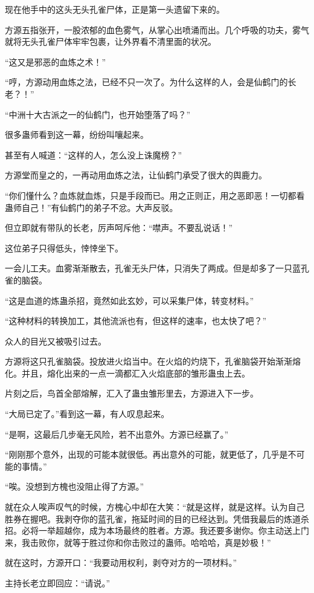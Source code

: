 \begin{this_body}
现在他手中的这头无头孔雀尸体，正是第一头遗留下来的。

方源五指张开，一股浓郁的血色雾气，从掌心出喷涌而出。几个呼吸的功夫，雾气就将无头孔雀尸体牢牢包裹，让外界看不清里面的状况。

“这又是邪恶的血炼之术！”

“哼，方源动用血炼之法，已经不只一次了。为什么这样的人，会是仙鹤门的长老？！”

“中洲十大古派之一的仙鹤门，也开始堕落了吗？”

很多蛊师看到这一幕，纷纷叫嚷起来。

甚至有人喊道：“这样的人，怎么没上诛魔榜？”

方源堂而皇之的，一再动用血炼之法，让仙鹤门承受了很大的舆鹿力。

“你们懂什么？血炼就血炼，只是手段而已。用之正则正，用之恶即恶！一切都看蛊师自己！”有仙鹤门的弟子不忿。大声反驳。

但立即就有带队的长老，厉声呵斥他：“噤声。不要乱说话！”

这位弟子只得低头，悻悻坐下。

一会儿工夫。血雾渐渐散去，孔雀无头尸体，只消失了两成。但是却多了一只蓝孔雀的脑袋。

“这是血道的炼蛊杀招，竟然如此玄妙，可以采集尸体，转变材料。”

“这种材料的转换加工，其他流派也有，但这样的速率，也太快了吧？”

众人的目光又被吸引过去。

方源将这只孔雀脑袋。投放进火焰当中。在火焰的灼烧下，孔雀脑袋开始渐渐熔化。并且，熔化出来的一点一滴都汇入火焰底部的雏形蛊虫上去。

片刻之后，鸟首全部熔解，汇入了蛊虫雏形里去，方源进入下一步。

“大局已定了。”看到这一幕，有人叹息起来。

“是啊，这最后几步毫无风险，若不出意外。方源已经赢了。”

“刚刚那个意外，出现的可能本就很低。再出意外的可能，就更低了，几乎是不可能的事情。”

“唉。没想到方槐也没阻止得了方源。”

就在众人唉声叹气的时候，方槐心中却在大笑：“就是这样，就是这样。认为自己胜券在握吧。我剥夺你的蓝孔雀，拖延时间的目的已经达到。凭借我最后的炼道杀招。必将一举超越你，成为本场最终的胜者。方源。我还要多谢你。你主动送上门来，我击败你，就等于胜过你和你击败过的蛊师。哈哈哈，真是妙极！”

就在这时，方源开口：“我要动用权利，剥夺对方的一项材料。”

主持长老立即回应：“请说。”


\end{this_body}
